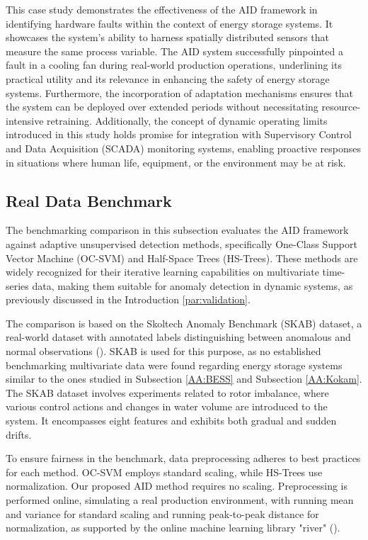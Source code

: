 This case study demonstrates the effectiveness of the AID framework in identifying hardware faults within the context of energy storage systems. It showcases the system's ability to harness spatially distributed sensors that measure the same process variable. The AID system successfully pinpointed a fault in a cooling fan during real-world production operations, underlining its practical utility and its relevance in enhancing the safety of energy storage systems. Furthermore, the incorporation of adaptation mechanisms ensures that the system can be deployed over extended periods without necessitating resource-intensive retraining. Additionally, the concept of dynamic operating limits introduced in this study holds promise for integration with Supervisory Control and Data Acquisition (SCADA) monitoring systems, enabling proactive responses in situations where human life, equipment, or the environment may be at risk.

\subsection{Real Data Benchmark}\label{AA:Benchmark}
The benchmarking comparison in this subsection evaluates the AID framework against adaptive unsupervised detection methods, specifically One-Class Support Vector Machine (OC-SVM) and Half-Space Trees (HS-Trees). These methods are widely recognized for their iterative learning capabilities on multivariate time-series data, making them suitable for anomaly detection in dynamic systems, as previously discussed in the Introduction \ref{par:validation}.

The comparison is based on the Skoltech Anomaly Benchmark (SKAB) dataset, a real-world dataset with annotated labels distinguishing between anomalous and normal observations (\cite{skab2020}). SKAB is used for this purpose, as no established benchmarking multivariate data were found regarding energy storage systems similar to the ones studied in Subsection \ref{AA:BESS} and Subsection \ref{AA:Kokam}. The SKAB dataset involves experiments related to rotor imbalance, where various control actions and changes in water volume are introduced to the system. It encompasses eight features and exhibits both gradual and sudden drifts.

To ensure fairness in the benchmark, data preprocessing adheres to best practices for each method. OC-SVM employs standard scaling, while HS-Trees use normalization. Our proposed AID method requires no scaling. Preprocessing is performed online, simulating a real production environment, with running mean and variance for standard scaling and running peak-to-peak distance for normalization, as supported by the online machine learning library "river" (\cite{Montiel2021}).

